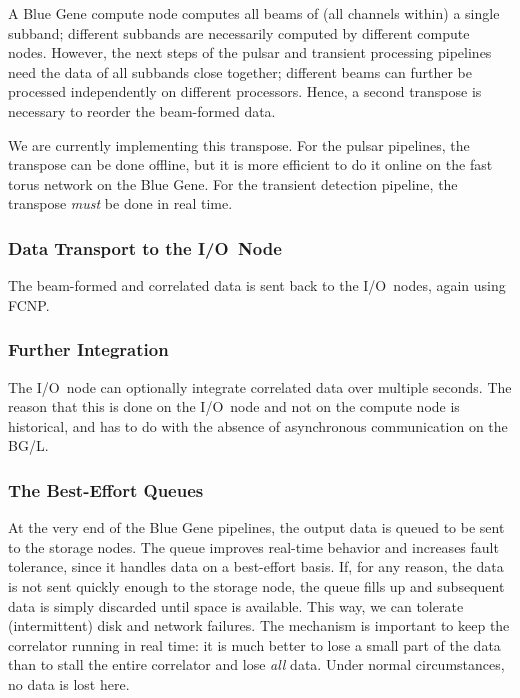 A Blue Gene compute node computes all beams of (all channels within) a
single subband; different subbands are necessarily computed by different 
compute nodes.
However, the next steps of the pulsar and transient processing pipelines
need the data of all subbands close together; different beams can further be
processed independently on different processors.
Hence, a second transpose is necessary to reorder the beam-formed data.

We are currently implementing this transpose.
For the pulsar pipelines, the transpose can be done offline, but it is more
efficient to do it online on the fast torus network on the Blue Gene.
For the transient detection pipeline, the transpose \emph{must\/} be done
in real time.


\subsubsection{Data Transport to the I/O~Node}

The beam-formed and correlated data is sent back to the I/O~nodes, again
using FCNP.

\subsubsection{Further Integration}

The I/O~node can optionally integrate correlated data over multiple seconds.
The reason that this is done on the I/O~node and not on the compute node is
historical, and has to do with the absence of asynchronous communication
on the BG/L.


\subsubsection{The Best-Effort Queues}

At the very end of the Blue Gene pipelines, the output data is queued to
be sent to the storage nodes.
The queue improves real-time behavior and increases fault tolerance, since
it handles data on a best-effort basis.
If, for any reason, the data is not sent quickly enough to the storage node,
the queue fills up and subsequent data is simply discarded until space is
available.
This way, we can tolerate (intermittent) disk and network failures.
The mechanism is important to keep the correlator running in real
time: it is much better to lose a small part of the data than to stall the
entire correlator and lose \emph{all\/} data.
Under normal circumstances, no data is lost here.


